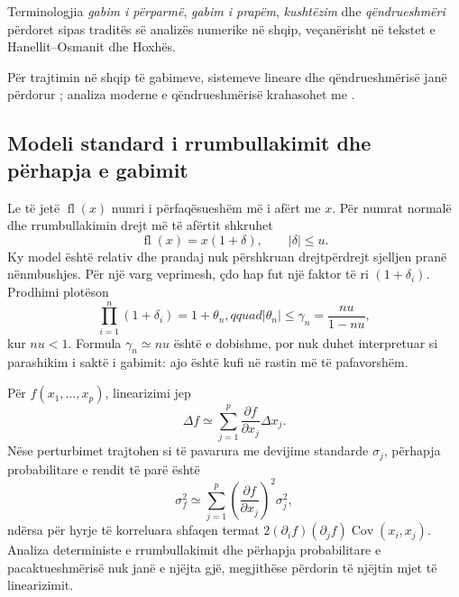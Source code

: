 \documentclass[11pt,oneside,openany]{book}
\begin{document}
Terminologjia \emph{gabim i përparmë}, \emph{gabim i prapëm}, \emph{kushtëzim} dhe \emph{qëndrueshmëri} përdoret sipas traditës së analizës numerike në shqip, veçanërisht në tekstet e Hanellit--Osmanit dhe Hoxhës.

Për trajtimin në shqip të gabimeve, sistemeve lineare dhe qëndrueshmërisë janë përdorur \cite{hanelli,hoxha,datja}; analiza moderne e qëndrueshmërisë krahasohet me \cite{higham}.



\subsection{Modeli standard i rrumbullakimit dhe përhapja e gabimit}
Le të jetë $\operatorname{fl}(x)$ numri i përfaqësueshëm më i afërt me $x$. Për numrat normalë dhe rrumbullakimin drejt më të afërtit shkruhet
\begin{equation}
 \operatorname{fl}(x)=x(1+\delta),\qquad |\delta|\le u.
\end{equation}
Ky model është relativ dhe prandaj nuk përshkruan drejtpërdrejt sjelljen pranë nënmbushjes. Për një varg veprimesh, çdo hap fut një faktor të ri $(1+\delta_i)$. Prodhimi plotëson
\begin{equation}
 \prod_{i=1}^{n}(1+\delta_i)=1+\theta_n,qquad
 |\theta_n|\le\gamma_n=\frac{nu}{1-nu},
\end{equation}
kur $nu<1$. Formula $\gamma_n\simeq nu$ është e dobishme, por nuk duhet interpretuar si parashikim i saktë i gabimit: ajo është kufi në rastin më të pafavorshëm.

Për $f(x_1,\ldots,x_p)$, linearizimi jep
\begin{equation}
 \Delta f\simeq\sum_{j=1}^{p}\frac{\partial f}{\partial x_j}\Delta x_j.
\end{equation}
Nëse perturbimet trajtohen si të pavarura me devijime standarde $\sigma_j$, përhapja probabilitare e rendit të parë është
\begin{equation}
 \sigma_f^2\simeq\sum_{j=1}^{p}\left(\frac{\partial f}{\partial x_j}\right)^2\sigma_j^2,
\end{equation}
ndërsa për hyrje të korreluara shfaqen termat $2(\partial_i f)(\partial_j f)\operatorname{Cov}(x_i,x_j)$. Analiza deterministe e rrumbullakimit dhe përhapja probabilitare e pacaktueshmërisë nuk janë e njëjta gjë, megjithëse përdorin të njëjtin mjet të linearizimit.
\end{document}

